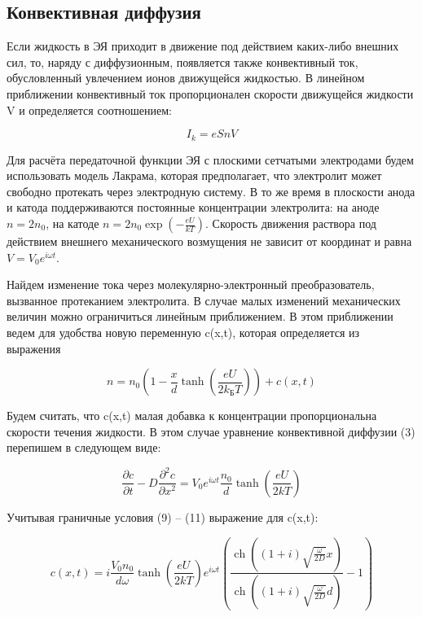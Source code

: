 \documentclass[a4paper,12pt]{article}
\begin{document}
\subsection{Конвективная диффузия}

Если жидкость в ЭЯ приходит в движение под действием каких-либо внешних сил, то, наряду с диффузионным, появляется также конвективный ток, обусловленный увлечением ионов движущейся жидкостью. В линейном приближении конвективный ток пропорционален скорости движущейся жидкости V и определяется соотношением:

\begin{equation}
I_k = e S n V
\end{equation}

Для расчёта передаточной функции ЭЯ с плоскими сетчатыми электродами будем использовать модель Лакрама, которая предполагает, что электролит может свободно протекать через электродную систему. В то же время в плоскости анода и катода поддерживаются постоянные концентрации электролита: на аноде $n = 2 n_0$, на катоде $n = 2 n_0 \exp \left(- \frac{eU}{k T} \right)$. Скорость движения раствора под действием внешнего механического
возмущения не зависит от координат и равна $V = V_0 e^{i \omega t}$.

Найдем изменение тока через молекулярно-электронный преобразователь, вызванное протеканием электролита. В случае малых изменений механических величин можно ограничиться линейным приближением. В этом приближении ведем для удобства новую переменную c(x,t), которая определяется из выражения

\begin{equation}
n = n_0\left( 1 - \frac{x}{d}\tanh\left(\frac{eU}{2 k_{Б} T}\right) \right) + c(x, t)
\end{equation}

Будем считать, что c(x,t) малая добавка к концентрации пропорциональна скорости течения жидкости. В этом случае уравнение конвективной диффузии (3) перепишем в следующем виде: 

\begin{equation}
\frac{\partial c}{\partial t} - D \frac{\partial^{2} c}{\partial x^{2}}=V_{0} e^{i \omega t} \frac{n_{0}}{d} \tanh \left(\frac{e U}{2 k T}\right)
\end{equation}

Учитывая граничные условия (9) -- (11) выражение для c(x,t): 

\begin{equation}
c(x, t)=i \frac{V_{0} n_{0}}{d \omega} \tanh \left(\frac{e U}{2 k T}\right) e^{i \omega t}\left(\frac{\operatorname{ch}\left((1+i) \sqrt{\frac{\omega}{2 D}} x\right)}{\operatorname{ch}\left((1+i) \sqrt{\frac{\omega}{2 D}} d\right)}-1\right)
\end{equation}
\end{document}
